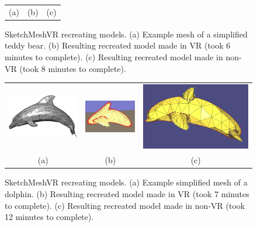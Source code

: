 \begin{figure}[!h]
\begin{tabular}{@{}ccc@{}}
    (a)&(b)&(c)\\
    \end{tabular}
    \caption[SketchMeshVR simplified teddy bear model]{SketchMeshVR recreating models.
    	  \textup{(a)} Example mesh of a simplified teddy bear.
	  \textup{(b)} Resulting recreated model made in VR (took 6 minutes to complete).
	  \textup{(c)} Resulting recreated model made in non-VR (took 8 minutes to complete).
      \label{fig:recreate_teddy}}
\end{figure}


\begin{figure}[!h]
    \centering
    \setlength{\tabcolsep}{0.0130\linewidth}
    \begin{tabular}{@{}ccc@{}}
    \includegraphics[width=0.3\linewidth]{figures/example_model_dolphin}&
  	\includegraphics[width=0.3\linewidth]{figures/results_dolphin_model}&
  	\includegraphics[width=0.3\linewidth]{figures/results_dolphin_model_nonVR}\\

    (a)&(b)&(c)\\
    \end{tabular}
    \caption[SketchMeshVR dolphin model]{SketchMeshVR recreating models.
    	  \textup{(a)} Example simplified mesh of a dolphin.
	  \textup{(b)} Resulting recreated model made in VR (took 7 minutes to complete).
	  \textup{(c)} Resulting recreated model made in non-VR (took 12 minutes to complete).
      \label{fig:recreate_dolphin}}
\end{figure}

